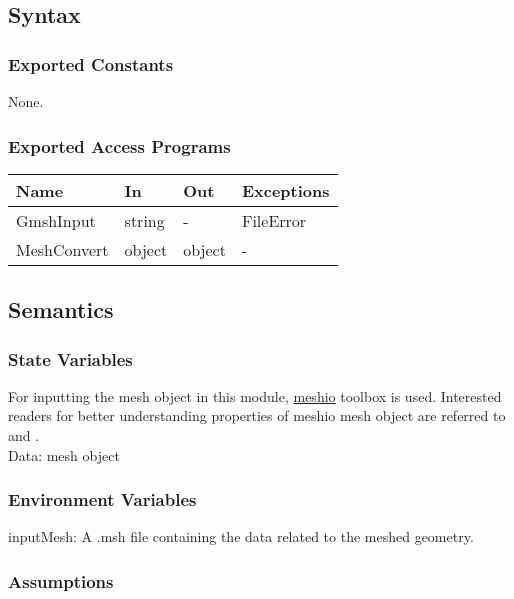 \documentclass[12pt, titlepage]{article}
\begin{document}
	\subsection{Syntax}
	
	\subsubsection{Exported Constants} None. \subsubsection{Exported Access
		Programs}
	
	\begin{center} \begin{tabular}{p{4cm} p{2cm} p{2cm} p{2cm}} \hline \textbf{Name}
			& \textbf{In} & \textbf{Out} & \textbf{Exceptions} \\ \hline GmshInput & string
			& - & FileError \\ MeshConvert & object & object & -\\ \hline \end{tabular}
	\end{center}
	
	\subsection{Semantics}
	
	\subsubsection{State Variables}
	
	For inputting the mesh object in this module,
	\hyperref{https://pypi.org/project/meshio/}{library}{}{meshio} toolbox is used.
	Interested readers for better understanding properties of meshio mesh object are
	referred to \cite{schlomer2019meshio} and \cite{dai2017high}. \\
	
	Data: mesh object
	
	\subsubsection{Environment Variables} inputMesh: A .msh file containing the data
	related to the meshed geometry.
	
	\subsubsection{Assumptions}
	
\end{document}
